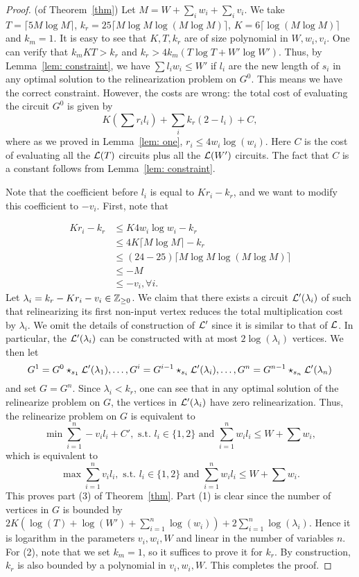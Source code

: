 \documentclass[11pt]{article} %
\theoremstyle{plain}
\theoremstyle{definition}
\begin{document}
\begin{proof} (of Theorem~\ref{thm}) 
Let 
$M = W + \sum_i w_i + \sum_i v_i$. We take $T = \lceil 5M \log M \rceil$, $k_r = 25 \lceil M \log M \log(M \log M) \rceil$,  $K = 6 \lceil \log(M \log M) \rceil$ and $k_m = 1$. It is easy to see that $K,T, k_r$ are of size polynomial in $W, w_i, v_i$. One can verify that 
$k_m KT > k_r$ and $k_r > 4k_m( T\log T + W' \log W')$. Thus, by Lemma~\ref{lem: constraint}, we have $\sum l_i w_i \leq W'$ if $l_i$ are the new length of $s_i$ in any optimal solution to the relinearization problem on $G^0$. This means we have the correct constraint. However, the costs are wrong: the total cost of evaluating the circuit $G^0$ is given by 
\[
	K(\sum r_i l_i) +\sum_i k_r (2 - l_i) + C, 
\]
where as we proved in Lemma~\ref{lem: one}, $r_i  \leq 4 w_i \log(w_i)$. Here $C$ is the cost of evaluating all the $\mathcal{L}(T)$ circuits plus all the $\mathcal{L}(W')$ circuits. The fact that $C$ is a constant follows from Lemma~\ref{lem: constraint}.



Note that the coefficient before $l_i$ is equal to $Kr_i - k_r$, and we want to modify this coefficient to $-v_i$. First, note that 

\begin{align*}
Kr_i - k_r &\leq K 4 w_i \log w_i - k_r  \\
&\leq 4 K \lceil M \log M \rceil - k_r  \\
&\leq (24 - 25) \lceil M \log M \log(M\log M) \rceil \\
&\leq -M  \\
&\leq -v_i, \forall i. 
\end{align*}
Let $\lambda_i = k_r - Kr_i - v_i \in \mathbb{Z}_{\geq 0}$. We claim that there exists a circuit $\mathcal{L}'(\lambda_i)$ of  such that relinearizing its first non-input vertex  reduces the total multiplication cost by $\lambda_i$. We omit the details of construction of $\mathcal{L}'$ since it is similar to that of $\mathcal{L}$. In particular, 
the $\mathcal{L}'(\lambda_i)$ can be constructed with at most $2 \log (\lambda_i)$ vertices. We then let 
\[
	G^1 = G^0 \star_{s_1} \mathcal{L}'(\lambda_1), \ldots, 	G^i = G^{i-1} \star_{s_i} \mathcal{L}'(\lambda_i), \ldots, G^n = G^{n-1} \star_{s_n}  \mathcal{L}'(\lambda_n)
\]
and set $G = G^n$. Since $\lambda_i < k_r$, one can see that in any optimal solution of the relinearize problem on $G$, the vertices in $\mathcal{L}'(\lambda_i)$ have zero relinearization. Thus, the relinearize problem on $G$ is equivalent to 
\[
\min \sum_{i=1}^{n} -v_i l_i + C',  \mbox{ s.t. }  l_i \in \{1, 2\} \mbox{ and } \sum_{i=1}^{n} w_i l_i \leq W + \sum w_i, 
\]
which is equivalent to 
\[
\max \sum_{i=1}^{n} v_i l_i,  \mbox{ s.t. }  l_i \in \{1, 2\} \mbox{ and } \sum_{i=1}^{n}  w_i l_i \leq W + \sum w_i.
\]
This proves part (3) of Theorem~\ref{thm}. Part (1) is clear since the number of vertices in $G$ is bounded by $2K ( \log(T) + \log(W') +  \sum_{i=1}^n \log(w_i) ) + 2\sum_{i=1}^n \log(\lambda_i)$. Hence it is logarithm in the parameters $v_i, w_i, W$ and linear in the number of variables $n$. For (2), note that we set $k_m =1$, so it suffices to prove it for $k_r$. By construction,  $k_r$ is also bounded by a polynomial in $v_i, w_i, W$. This completes the proof.
\end{proof}
\end{document}
